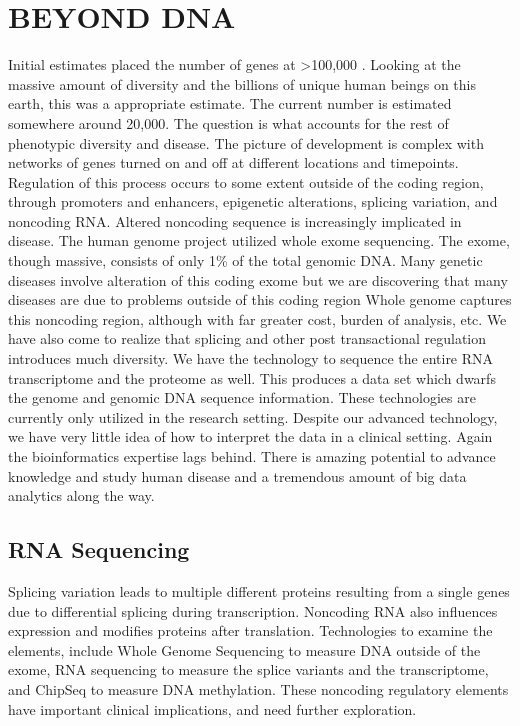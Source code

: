 \documentclass[sigconf]{acmart}
\begin{document}
\section{	BEYOND DNA}

Initial estimates placed the number of genes at >100,000
\cite{vanderbilt}.  Looking at the massive amount of diversity and the
billions of unique human beings on this earth, this was a appropriate
estimate.  The current number is estimated somewhere around 20,000.
The question is what accounts for the rest of phenotypic diversity and
disease.  The picture of  development is complex with networks of genes turned on and off at different locations and timepoints.  Regulation of this process occurs to some extent outside of the coding region, through promoters and enhancers, epigenetic alterations, splicing variation, and noncoding RNA.   Altered noncoding sequence is increasingly implicated in disease.  The human genome project utilized whole exome sequencing.  The exome, though massive, consists of
only 1\% of the total genomic DNA.  Many genetic diseases involve
alteration of this coding exome but we are discovering that many
diseases are due to problems outside of this coding region  Whole genome captures this noncoding region, although with far greater cost, burden of analysis, etc.   We have also come to realize that splicing and other
post transactional regulation introduces much diversity.  We have the
technology to sequence the entire RNA transcriptome and the proteome
as well.  This produces a data set which dwarfs the genome and genomic
DNA sequence information.  These technologies are currently only
utilized in the research setting.  Despite our advanced technology, we
have very little idea of how to interpret the data in a clinical
setting.  Again the bioinformatics expertise lags behind.  There is
amazing potential to advance knowledge and study human disease and a
tremendous amount of big data analytics along the way.

\subsection{RNA Sequencing}
Splicing variation leads to multiple different proteins resulting from a single genes due to differential splicing during transcription.  Noncoding RNA also influences expression and modifies proteins after translation.  Technologies to examine the elements, include Whole Genome Sequencing to measure DNA outside of the exome, RNA sequencing to measure the splice variants and the transcriptome, and ChipSeq to measure DNA methylation.  These noncoding regulatory elements have important clinical implications, and need further exploration. \cite{wang2009rna}
  
\end{document}
